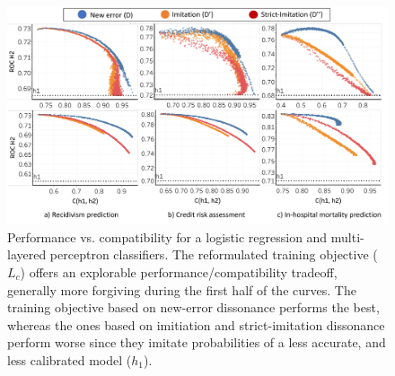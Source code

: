 \documentclass[letterpaper]{article} %
\newcommand{\?}{\mbox{?}}
\newcommand{\hone}{\mbox{$h_1$}}
\newcommand{\loss}{L}
\newcommand{\lossbc}{\loss_c}
\begin{document}
\begin{figure}[t]
    \centering
    \includegraphics[width=0.9\linewidth]{figure5.pdf}
    \caption{Performance vs. compatibility for a logistic regression and multi-layered perceptron classifiers. The reformulated training objective ($\lossbc$) offers an explorable performance/compatibility tradeoff, generally more forgiving during the first half of the curves. The training objective based on new-error dissonance performs the best, whereas the ones based on imitiation and strict-imitation dissonance perform worse since they imitate probabilities of a less accurate, and less calibrated model ($\hone$).}
    \label{fig:diss}
\end{figure}
\end{document}
